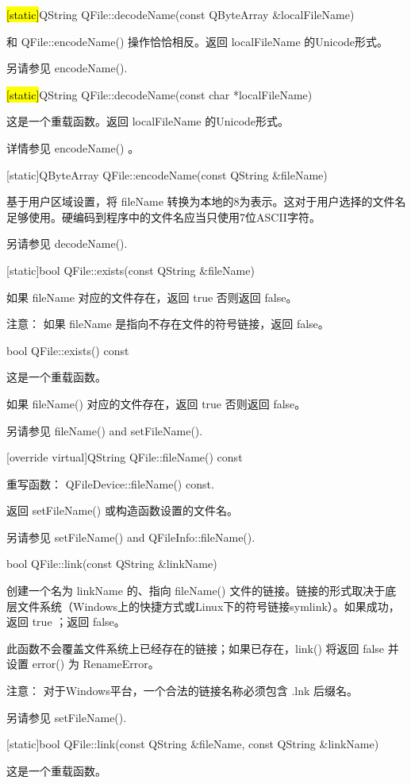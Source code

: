 \hl{[static]}QString QFile::decodeName(const QByteArray \&localFileName)

和 QFile::encodeName() 操作恰恰相反。返回 localFileName 的Unicode形式。

另请参见 encodeName().

\hl{[static]}QString QFile::decodeName(const char *localFileName)

这是一个重载函数。返回 localFileName 的Unicode形式。

详情参见 encodeName() 。

[static]QByteArray QFile::encodeName(const QString \&fileName)

基于用户区域设置，将 fileName 转换为本地的8为表示。这对于用户选择的文件名足够使用。硬编码到程序中的文件名应当只使用7位ASCII字符。

另请参见 decodeName().

[static]bool QFile::exists(const QString \&fileName)

如果 fileName 对应的文件存在，返回 true 否则返回 false。

注意： 如果 fileName 是指向不存在文件的符号链接，返回 false。

bool QFile::exists() const

这是一个重载函数。

如果 fileName() 对应的文件存在，返回 true 否则返回 false。

另请参见 fileName() and setFileName().

[override virtual]QString QFile::fileName() const

重写函数： QFileDevice::fileName() const.

返回 setFileName() 或构造函数设置的文件名。

另请参见 setFileName() and QFileInfo::fileName().

bool QFile::link(const QString \&linkName)

创建一个名为 linkName 的、指向 fileName() 文件的链接。链接的形式取决于底层文件系统（Windows上的快捷方式或Linux下的符号链接symlink）。如果成功，返回 true ；返回 false。

此函数不会覆盖文件系统上已经存在的链接；如果已存在，link() 将返回 false 并设置 error() 为 RenameError。

注意： 对于Windows平台，一个合法的链接名称必须包含 .lnk 后缀名。

另请参见 setFileName().

[static]bool QFile::link(const QString \&fileName, const QString \&linkName)

这是一个重载函数。

